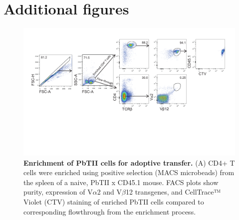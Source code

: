 \section{Additional figures}

\begin{figure}
    \centering
    \includegraphics[width=\textwidth]{"Fig S1 rev3"}
    \caption[Enrichment of PbTII cells for adoptive transfer]{\textbf{Enrichment of PbTII cells for adoptive transfer.} (A) CD4+ T cells were enriched using positive selection (MACS microbeads) from the spleen of a naive, PbTII x CD45.1 mouse. FACS plots show purity, expression of V\( \alpha \)2 and V\( \beta \)12 transgenes, and CellTrace™ Violet (CTV) staining of enriched PbTII cells compared to corresponding flowthrough from the enrichment process.}
    \label{fig:ms1}
\end{figure}

